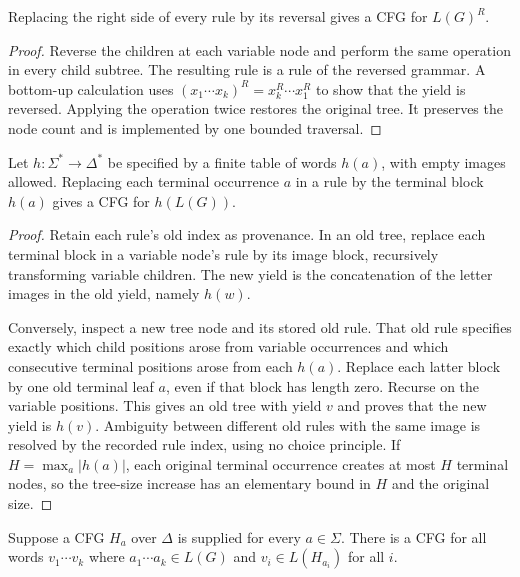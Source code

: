 \begin{theorem}[Reversal]
\label{cf:reversal}
Replacing the right side of every rule by its reversal gives a CFG for
$L(G)^R$.
\end{theorem}

\begin{proof}
Reverse the children at each variable node and perform the same operation
in every child subtree.  The resulting rule is a rule of the reversed
grammar.  A bottom-up calculation uses
$(x_1\cdots x_k)^R=x_k^R\cdots x_1^R$ to show that the yield is reversed.
Applying the operation twice restores the original tree.  It preserves
the node count and is implemented by one bounded traversal.
\end{proof}

\begin{theorem}
\label{cf:homomorphism}
Let $h:\Sigma^*\to\Delta^*$ be specified by a finite table of words
$h(a)$, with empty images allowed.  Replacing each terminal occurrence
$a$ in a rule by the terminal block $h(a)$ gives a CFG for $h(L(G))$.
\end{theorem}

\begin{proof}
Retain each rule's old index as provenance.  In an old tree, replace each
terminal block in a variable node's rule by its image block, recursively
transforming variable children.  The new yield is the concatenation of the
letter images in the old yield, namely $h(w)$.

Conversely, inspect a new tree node and its stored old rule.  That old rule
specifies exactly which child positions arose from variable occurrences
and which consecutive terminal positions arose from each $h(a)$.  Replace
each latter block by one old terminal leaf $a$, even if that block has
length zero.  Recurse on the variable positions.  This gives an old tree
with yield $v$ and proves that the new yield is $h(v)$.  Ambiguity between
different old rules with the same image is resolved by the recorded rule
index, using no choice principle.  If $H=\max_a|h(a)|$, each original
terminal occurrence creates at most $H$ terminal nodes, so the tree-size
increase has an elementary bound in $H$ and the original size.
\end{proof}

\begin{theorem}
\label{cf:substitution}
Suppose a CFG $H_a$ over $\Delta$ is supplied for every $a\in\Sigma$.
There is a CFG for all words $v_1\cdots v_k$ where
$a_1\cdots a_k\in L(G)$ and $v_i\in L(H_{a_i})$ for all $i$.
\end{theorem}

